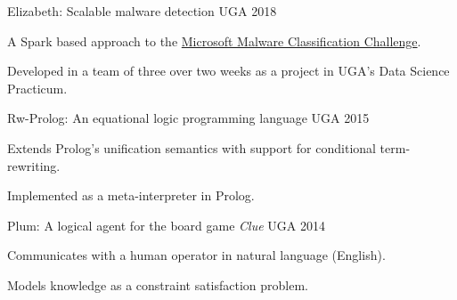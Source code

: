 \begin{cventries}

\cventry
{\textnormal{}}
{Elizabeth: Scalable malware detection}
{UGA}
{2018}
{\begin{cvitems}
    \item {A Spark based approach to the \href{https://www.kaggle.com/c/malware-classification/}{Microsoft Malware Classification Challenge}.}
    \item {Developed in a team of three over two weeks as a project in UGA's Data Science Practicum.}
\end{cvitems}}

\cventry
{\textnormal{}}
{Rw-Prolog: An equational logic programming language}
{UGA}
{2015}
{\begin{cvitems}
    \item {Extends Prolog's unification semantics with support for conditional term-rewriting.}
    \item {Implemented as a meta-interpreter in Prolog.}
\end{cvitems}}

\cventry
{\textnormal{}}
{Plum: A logical agent for the board game \textit{Clue}}
{UGA}
{2014}
{\begin{cvitems}
    \item {Communicates with a human operator in natural language (English).}
    \item {Models knowledge as a constraint satisfaction problem.}
\end{cvitems}}

\end{cventries}

